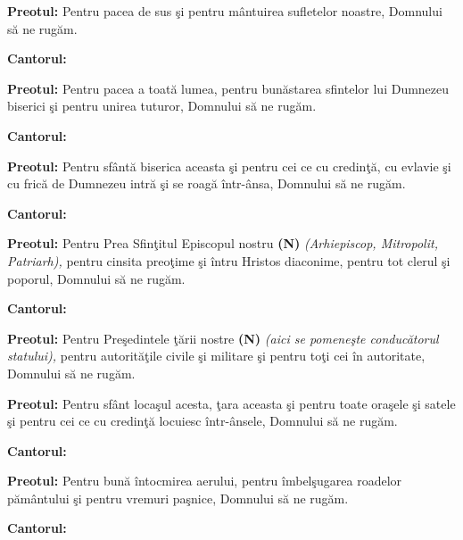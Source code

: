 \documentclass[11pt,letterpaper]{book} \usepackage{ucs}
\begin{document}
  {\bf Preotul:} Pentru pacea de sus şi pentru mântuirea sufletelor
  noastre, Domnului să ne rugăm.

  {\bf Cantorul:}
  \begin{center}
  \end{center}

  {\bf Preotul:} Pentru pacea a toată lumea, pentru bunăstarea
  sfintelor lui Dumnezeu biserici şi pentru unirea tuturor, Domnului
  să ne rugăm.

  {\bf Cantorul:}
  \begin{center}
  \end{center}
  \pagebreak

  {\bf Preotul:} Pentru sfântă biserica aceasta şi pentru cei ce cu
  credinţă, cu evlavie şi cu frică de Dumnezeu intră şi se roagă
  într-ânsa, Domnului să ne rugăm.

  {\bf Cantorul:}
  \begin{center}
  \end{center}

  {\bf Preotul:} Pentru Prea Sfinţitul Episcopul nostru {\bf (N)} {\em
  (Arhiepiscop, Mitropolit, Patriarh),} pentru cinsita preoţime şi
  întru Hristos diaconime, pentru tot clerul şi poporul, Domnului să
  ne rugăm.

  {\bf Cantorul:}
  \begin{center}
  \end{center}
  \pagebreak

  {\bf Preotul:} Pentru Preşedintele ţării nostre {\bf (N)} {\em (aici
  se pomeneşte conducătorul statului),} pentru autorităţile civile şi
  militare şi pentru toţi cei în autoritate, Domnului să ne rugăm.
  
  {\bf Preotul:} Pentru sfânt locaşul acesta, ţara aceasta şi pentru
  toate oraşele şi satele şi pentru cei ce cu credinţă locuiesc
  într-ânsele, Domnului să ne rugăm.

  {\bf Cantorul:}
  \begin{center}
  \end{center}

  {\bf Preotul:} Pentru bună întocmirea aerului, pentru îmbelşugarea
  roadelor pământului şi pentru vremuri paşnice, Domnului să ne rugăm.

  {\bf Cantorul:}
  \begin{center}
  \end{center}
  \pagebreak
\end{document}
